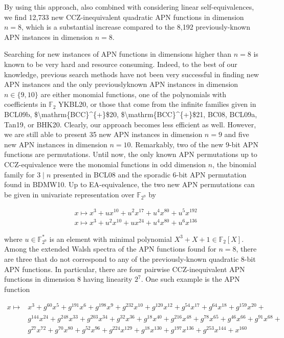 \documentclass[10pt]{article}
\begin{document}
By using this approach, also combined with considering linear self-equivalences, we find 12,733 new CCZ-inequivalent quadratic APN functions in dimension $n=8$, which is a substantial increase compared to the 8,192 previously-known APN instances in dimension $n=8$.

Searching for new instances of APN functions in dimensions higher than $n=8$ is known to be very hard and resource consuming. Indeed, to the best of our knowledge, previous search methods have not been very successful in finding new APN instances and the only previouslyknown APN instances in dimension $n \in\{9,10\}$ are either monomial functions, one of the polynomials with coefficients in $\mathbb{F}_{2}$ YKBL20, or those that come from the infinite families given in BCL09b, \$\textbackslash mathrm\{BCC\}\^{}\{+\}\$20, \$\textbackslash mathrm\{BCC\}\^{}\{+\}\$21, BC08, BCL09a, Tan19, or BHK20. Clearly, our approach becomes less efficient as well. However, we are still able to present 35 new APN instances in dimension $n=9$ and five new APN instances in dimension $n=10$. Remarkably, two of the new 9-bit APN functions are permutations. Until now, the only known APN permutations up to CCZ-equivalence were the monomial functions in odd dimension $n$, the binomial family for $3 \mid n$ presented in BCL08 and the sporadic 6-bit APN permutation found in BDMW10. Up to EA-equivalence, the two new APN permutations can be given in univariate representation over $\mathbb{F}_{2^{9}}$ by

$$
\begin{aligned}
& x \mapsto x^{3}+u x^{10}+u^{2} x^{17}+u^{4} x^{80}+u^{5} x^{192} \\
& x \mapsto x^{3}+u^{2} x^{10}+u x^{24}+u^{4} x^{80}+u^{6} x^{136}
\end{aligned}
$$

where $u \in \mathbb{F}_{2^{9}}^{*}$ is an element with minimal polynomial $X^{3}+X+1 \in \mathbb{F}_{2}[X]$.\\
Among the extended Walsh spectra of the APN functions found for $n=8$, there are three that do not correspond to any of the previously-known quadratic 8-bit APN functions. In particular, there are four pairwise CCZ-inequivalent APN functions in dimension 8 having linearity $2^{7}$. One such example is the APN function

$$
\begin{aligned}
x \mapsto & x^{3}+g^{60} x^{5}+g^{191} x^{6}+g^{198} x^{9}+g^{232} x^{10}+g^{120} x^{12}+g^{54} x^{17}+g^{64} x^{18}+g^{159} x^{20}+ \\
& g^{144} x^{24}+g^{248} x^{33}+g^{203} x^{34}+g^{32} x^{36}+g^{18} x^{40}+g^{216} x^{48}+g^{78} x^{65}+g^{46} x^{66}+g^{91} x^{68}+ \\
& g^{27} x^{72}+g^{70} x^{80}+g^{52} x^{96}+g^{224} x^{129}+g^{18} x^{130}+g^{197} x^{136}+g^{253} x^{144}+x^{160}
\end{aligned}
$$
\end{document}
